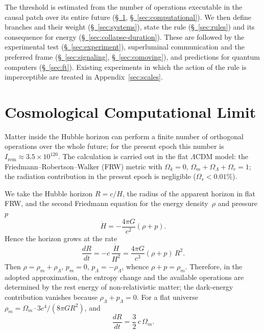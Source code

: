 \documentclass[11pt,a4paper]{article}
\newcommand{\Ost}{I_{\mathrm{rem}}}
\begin{document}
The threshold is estimated from the number of operations executable in the causal patch over its entire future (\hyperref[sec:cosmological-limit]{\S~\ref*{sec:cosmological-limit}}, \hyperref[sec:computational]{\S~\ref*{sec:computational}}). We then define branches and their weight (\hyperref[sec:systems]{\S~\ref*{sec:systems}}), state the rule (\hyperref[sec:rules]{\S~\ref*{sec:rules}}) and its consequence for energy (\hyperref[sec:collapse-duration]{\S~\ref*{sec:collapse-duration}}). These are followed by the experimental test (\hyperref[sec:experiment]{\S~\ref*{sec:experiment}}), superluminal communication and the preferred frame (\hyperref[sec:signaling]{\S~\ref*{sec:signaling}}, \hyperref[sec:comoving]{\S~\ref*{sec:comoving}}), and predictions for quantum computers (\hyperref[sec:ft]{\S~\ref*{sec:ft}}). Existing experiments in which the action of the rule is imperceptible are treated in Appendix~\ref{sec:scales}.

\section{Cosmological Computational Limit}
\label{sec:cosmological-limit}

Matter inside the Hubble horizon can perform a finite number of orthogonal operations over the whole future; for the present epoch this number is $\Ost\approx 3.5\times 10^{120}$. The calculation is carried out in the flat $\Lambda$CDM model: the Friedmann--Robertson--Walker (FRW) metric with $\Omega_k=0$, $\Omega_m+\Omega_\Lambda+\Omega_r=1$; the radiation contribution in the present epoch is negligible ($\Omega_r<0.01\%$).

We take the Hubble horizon $R=c/H$, the radius of the apparent horizon in flat FRW, and the second Friedmann equation for the energy density~$\rho$ and pressure~$p$
\begin{equation}
\dot H = -\frac{4\pi G}{c^2}(\rho+p).
\end{equation}
Hence the horizon grows at the rate
\begin{equation}
\frac{dR}{dt}
= -c\,\frac{\dot H}{H^2}
= \frac{4\pi G}{c^3}(\rho+p)\,R^2.
\end{equation}
Then $\rho=\rho_m+\rho_\Lambda$, $p_m=0$, $p_\Lambda=-\rho_\Lambda$, whence $\rho+p=\rho_m$. Therefore, in the adopted approximation, the entropy change and the available operations are determined by the rest energy of non-relativistic matter; the dark-energy contribution vanishes because $\rho_\Lambda+p_\Lambda=0$. For a flat universe $\rho_m=\Omega_m\cdot 3c^4/(8\pi G R^2)$, and
\begin{equation}
\frac{dR}{dt} = \frac{3}{2}\,c\,\Omega_m.
\end{equation}
\end{document}

